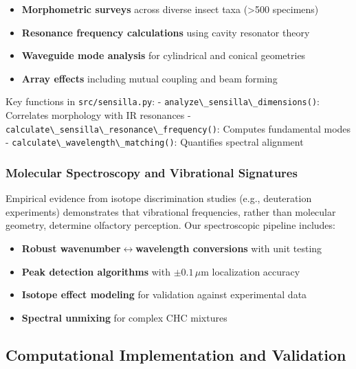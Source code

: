 \documentclass[
  13pt,
  a4paperpaper,
  12pt]{article}
\newcommand{\passthrough}[1]{#1}
\providecommand{\tightlist}{%
  \setlength{\itemsep}{0pt}\setlength{\parskip}{0pt}}
\begin{document}
\begin{itemize}
\tightlist
\item
  \textbf{Morphometric surveys} across diverse insect taxa
  (\textgreater500 specimens)
\item
  \textbf{Resonance frequency calculations} using cavity resonator
  theory
\item
  \textbf{Waveguide mode analysis} for cylindrical and conical
  geometries
\item
  \textbf{Array effects} including mutual coupling and beam forming
\end{itemize}

Key functions in \passthrough{\lstinline!src/sensilla.py!}: -
\passthrough{\lstinline!analyze\_sensilla\_dimensions()!}: Correlates
morphology with IR resonances -
\passthrough{\lstinline!calculate\_sensilla\_resonance\_frequency()!}:
Computes fundamental modes -
\passthrough{\lstinline!calculate\_wavelength\_matching()!}: Quantifies
spectral alignment

\subsubsection{Molecular Spectroscopy and Vibrational
Signatures}\label{molecular-spectroscopy-and-vibrational-signatures}

Empirical evidence from isotope discrimination studies (e.g.,
deuteration experiments) demonstrates that vibrational frequencies,
rather than molecular geometry, determine olfactory perception. Our
spectroscopic pipeline includes:

\begin{itemize}
\tightlist
\item
  \textbf{Robust wavenumber\(\leftrightarrow\)wavelength conversions}
  with unit testing
\item
  \textbf{Peak detection algorithms} with \(\pm 0.1\,\mu\mathrm{m}\)
  localization accuracy
\item
  \textbf{Isotope effect modeling} for validation against experimental
  data
\item
  \textbf{Spectral unmixing} for complex CHC mixtures
\end{itemize}

\subsection{Computational Implementation and
Validation}\label{computational-implementation-and-validation}
\end{document}
